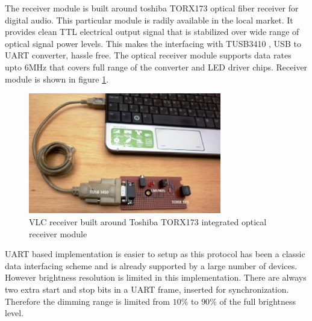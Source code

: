 The receiver module is built around toshiba TORX173 \cite{TORX173} optical fiber receiver for digital audio. This particular module is radily available in the local market. It provides clean TTL electrical output signal  that is stabilized over wide range of optical signal power levels. This makes the interfacing with TUSB3410 \cite{TUSB3410}, USB to UART converter, hassle free. The optical receiver module supports data rates upto 6MHz that covers full range of the converter and LED driver chips. Receiver module is shown in figure \ref{fig:rx_hardware}. 

\begin{figure}[hbtp]
\centering
\includegraphics[angle=0,width=0.75\textwidth]{./Figures/Receiver_v2.jpg}
\caption[VLC receiver hardware]{VLC receiver built around Toshiba TORX173 integrated optical receiver module}
\label{fig:rx_hardware}
\end{figure}

UART based implementation is easier to setup as this protocol has been a classic data interfacing scheme and is already supported by a large number of devices. However brightness resolution is limited in this implementation. There are always two extra start and stop bits in a UART frame, inserted for synchronization. Therefore the dimming range is limited from $10\%$  to $90\%$ of the full brightness level.




